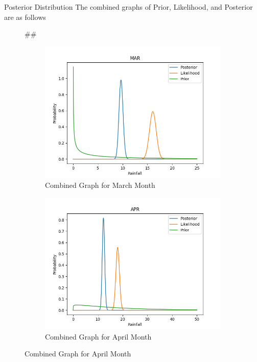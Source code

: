 \documentclass{beamer}
\newenvironment{subcolumns}[1]
 {\valign\bgroup\hsize=#1##\cr}
 {\crcr\egroup}
\newcommand{\nextsubcolumn} {\cr\noalign{\hfill}}
\begin{document}
\begin{frame}{Posterior Distribution}
The combined graphs of Prior, Likelihood, and Posterior are as follows
\begin{figure}[htp]
\centering
\begin{subcolumns}{0.50\columnwidth}
\begin{subfigure}{0.50\columnwidth}
\centering
\includegraphics[width=\textwidth]{Images/MAR.png}
\caption{Combined Graph for March Month}
\end{subfigure}
\nextsubcolumn
\begin{subfigure}{0.5\columnwidth}
\centering
\includegraphics[width=\textwidth]{Images/APR.png}
\caption{Combined Graph for April Month}
\end{subfigure}
\end{subcolumns}
\end{figure}
\end{frame}
\end{document}

